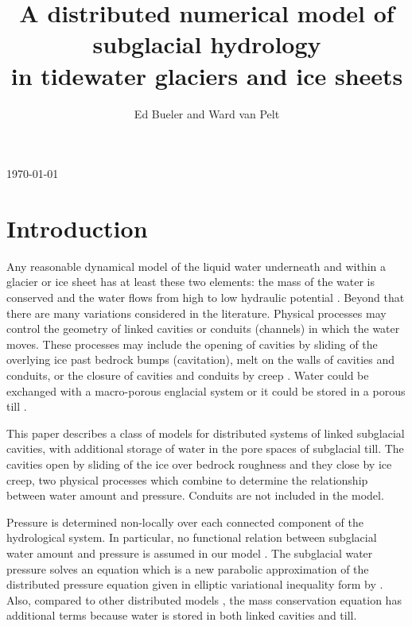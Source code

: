 \documentclass[11pt,final]{amsart}
\title[]{A distributed numerical model of subglacial hydrology \\ in tidewater glaciers and ice sheets}
\author[]{Ed Bueler and Ward van Pelt}
\begin{document}
\graphicspath{{figs/}}

\scriptsize \hfill \today \normalsize
\vspace{0.5in}

\maketitle
\thispagestyle{empty}


\section{Introduction}

Any reasonable dynamical model of the liquid water underneath and within a glacier or ice sheet has at least these two elements: the mass of the water is conserved and the water flows from high to low hydraulic potential \citep{Clarke05}.  Beyond that there are many variations considered in the literature.  Physical processes may control the geometry of linked cavities \citep{Kamb1987} or conduits (channels) \citep{Nye1976} in which the water moves.  These processes may include the opening of cavities by sliding of the overlying ice past bedrock bumps (cavitation), melt on the walls of cavities and conduits, or the closure of cavities and conduits by creep \citep{Hewitt2011}.  Water could be exchanged with a macro-porous englacial system \citep{Bartholomausetal2011,Harperetal2010} or it could be stored in a porous till \citep{Tulaczyketal2000}.

This paper describes a class of models for distributed systems of linked subglacial cavities, with additional storage of water in the pore spaces of subglacial till.  The cavities open by sliding of the ice over bedrock roughness and they close by ice creep, two physical processes which combine to determine the relationship between water amount and pressure.  Conduits are not included in the model.

Pressure is determined non-locally over each connected component of the hydrological system.  In particular, no functional relation between subglacial water amount and pressure is assumed in our model \citep[compare][]{FlowersClarke2002_theory}.  The subglacial water pressure solves an equation which is a new parabolic approximation of the distributed pressure equation given in elliptic variational inequality form by \cite{Schoofetal2012}.  Also, compared to other distributed models \citep{Hewitt2013,Schoofetal2012}, the mass conservation equation has additional terms because water is stored in both linked cavities and till.
\end{document}
